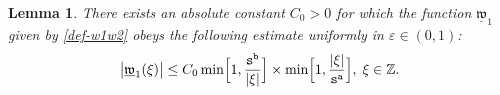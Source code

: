 \documentclass[12pt, twoside]{article}
\newtheorem{lemma}[theorem]{Lemma}
\theoremstyle{definition}
\numberwithin{equation}{section}
\begin{document}
\begin{lemma} \label{(B*-1)-lemma}
There exists an absolute constant $C_0 > 0$ for which the function $\underline{\mathfrak w}_1$ given by \eqref{def-w1w2}
obeys the following estimate uniformly in $\varepsilon\in (0,1)$:  
 \begin{equation} \label{(B*-1)-estimate}
\bigl| \underline{\mathfrak w}_1(\xi) \bigr| \leq C_0 \min \Bigl[1, \frac{\mathtt s^{\mathtt b}}{|\xi|}\Bigr] \times \min \Bigl[1, \frac{|\xi|}{\mathtt s^{\mathtt a}}\Bigr],\; \xi \in \mathbb{Z}. 
 \end{equation} 
\end{lemma}  
\end{document}
